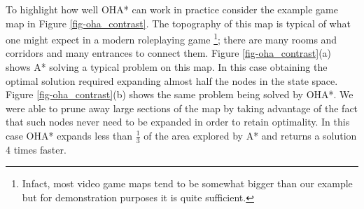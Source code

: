 To highlight how well OHA* can work in practice consider the example game map in Figure 
\ref{fig-oha_contrast}. 
The topography of this map is typical of what one might expect in a modern roleplaying game
\footnote{Infact, most video game maps tend to be somewhat bigger than our example but for demonstration 
purposes it is quite sufficient.};
there are many rooms and corridors and many entrances to connect them.
Figure \ref{fig-oha_contrast}(a) shows A* solving a typical problem on this map. 
In this case obtaining the optimal solution required expanding almost half the nodes in the state space.
Figure \ref{fig-oha_contrast}(b) shows the same problem being solved by OHA*.
We were able to prune away large sections of the map by taking advantage of the fact that
such nodes never need to be expanded in order to retain optimality.
In this case OHA* expands less than $\frac{1}{3}$ of the area explored by A* and returns
a solution 4 times faster.

